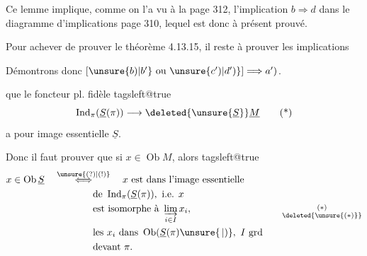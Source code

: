 
Ce lemme implique, comme on l'a vu à la page 312, l'implication $b\Longrightarrow d$ dans le diagramme d'implications  page 310, lequel est donc à présent prouvé.

Pour achever de prouver le théorème 4.13.15, il reste à prouver les implications

Démontrons donc $[\unsure{b)|b'}\ \text{ou}\ \unsure{c')|d')}]\Longrightarrow a')$.

   
que le foncteur pl. fidèle 
\begingroup\csname tagsleft@true\endcsname
\[
\operatorname{Ind}_\pi(\underline S(\pi))\longrightarrow\deleted{\unsure{\underline S}}\underline M
\tag*{(*)}
\]
\endgroup
a pour image essentielle  $\underline S$.


Donc il faut prouver que si $x\in\operatorname{Ob} M$, alors
\begingroup\csname tagsleft@true\endcsname
\[
\begin{aligned}
 x\in\operatorname{Ob}\underline S\quad&\overset{\unsure{(?)|(!)}}{\Longleftrightarrow}\quad x\ \text{est dans l'image essentielle}\\
 &\hspace{4em}\text{de }\operatorname{Ind}_\pi(\underline S(\pi)),\ \text{i.e. }x\\
 &\hspace{4em}\text{est isomorphe à }\varinjlim_{i\in I}x_i,\\
 &\hspace{4em}\text{les }x_i\ \text{dans }\operatorname{Ob}(\underline S(\pi)\unsure{\,|)} ,\ I\ \text{grd}\\
 &\hspace{4em}\text{devant }\pi.
\end{aligned}
\tag*{$\substack{(*)\\\deleted{\unsure{(*)}}}$}
\]
\endgroup
